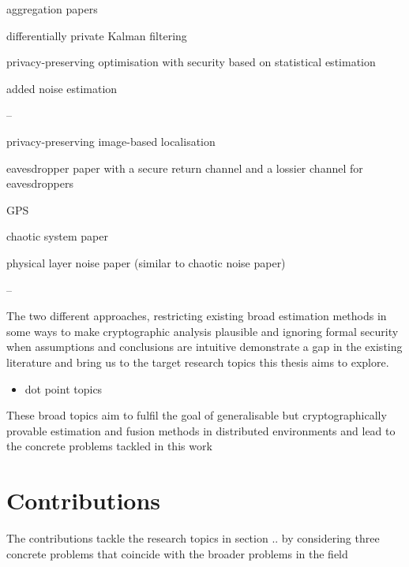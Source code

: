 aggregation papers

differentially private Kalman filtering

privacy-preserving optimisation with security based on statistical estimation

added noise estimation

--

privacy-preserving image-based localisation

eavesdropper paper with a secure return channel and a lossier channel for eavesdroppers

GPS

chaotic system paper

physical layer noise paper (similar to chaotic noise paper)

--


The two different approaches, restricting existing broad estimation methods in some ways to make cryptographic analysis plausible and ignoring formal security when assumptions and conclusions are intuitive demonstrate a gap in the existing literature and bring us to the target research topics this thesis aims to explore.

\begin{itemize}
    \item dot point topics
\end{itemize}

These broad topics aim to fulfil the goal of generalisable but cryptographically provable estimation and fusion methods in distributed environments and lead to the concrete problems tackled in this work

% 
%                                                
%                                                
%                                                
% 
\section{Contributions}

The contributions tackle the research topics in section .. by considering three concrete problems that coincide with the broader problems in the field



